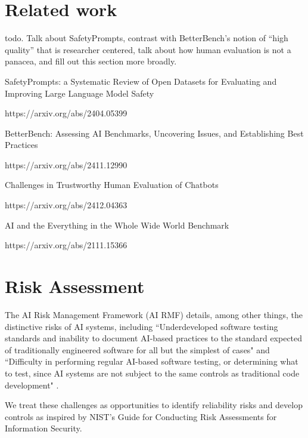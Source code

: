 \documentclass{article}
\begin{document}
\section{Related work}

todo. Talk about SafetyPrompts, contrast with BetterBench's notion of ``high quality'' that is researcher centered, talk about how human evaluation is not a panacea, and fill out this section more broadly.

SafetyPrompts: a Systematic Review of Open Datasets for Evaluating and Improving Large Language Model Safety

https://arxiv.org/abs/2404.05399


BetterBench: Assessing AI Benchmarks, Uncovering Issues, and Establishing Best Practices

https://arxiv.org/abs/2411.12990


Challenges in Trustworthy Human Evaluation of Chatbots

https://arxiv.org/abs/2412.04363

AI and the Everything in the Whole Wide World Benchmark

https://arxiv.org/abs/2111.15366

\section{Risk Assessment}
The AI Risk Management Framework (AI RMF) details, among other things, the distinctive risks of AI systems, including ``Underdeveloped software testing standards and inability to document AI-based practices to the standard expected of traditionally engineered software for all but the simplest of cases" and ``Difficulty in performing regular AI-based software testing, or determining what to test, since AI systems are not subject to the same controls as traditional code development" \cite{nistAI_RMF}.

We treat these challenges as opportunities to identify reliability risks and develop controls
as inspired by NIST's Guide for Conducting Risk Assessments for Information Security.
\end{document}
